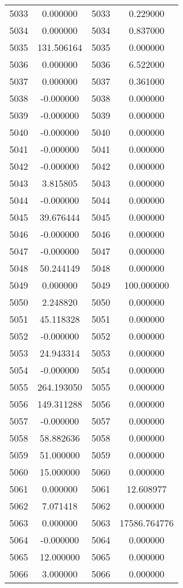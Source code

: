 \documentclass[12pt]{article}
\begin{document}
\begin{longtable}{@{}cccc@{}}
5033 & 0.000000 & 5033 & 0.229000 \\
5034 & 0.000000 & 5034 & 0.837000 \\
5035 & 131.506164 & 5035 & 0.000000 \\
5036 & 0.000000 & 5036 & 6.522000 \\
5037 & 0.000000 & 5037 & 0.361000 \\
5038 & -0.000000 & 5038 & 0.000000 \\
5039 & -0.000000 & 5039 & 0.000000 \\
5040 & -0.000000 & 5040 & 0.000000 \\
5041 & -0.000000 & 5041 & 0.000000 \\
5042 & -0.000000 & 5042 & 0.000000 \\
5043 & 3.815805 & 5043 & 0.000000 \\
5044 & -0.000000 & 5044 & 0.000000 \\
5045 & 39.676444 & 5045 & 0.000000 \\
5046 & -0.000000 & 5046 & 0.000000 \\
5047 & -0.000000 & 5047 & 0.000000 \\
5048 & 50.244149 & 5048 & 0.000000 \\
5049 & 0.000000 & 5049 & 100.000000 \\
5050 & 2.248820 & 5050 & 0.000000 \\
5051 & 45.118328 & 5051 & 0.000000 \\
5052 & -0.000000 & 5052 & 0.000000 \\
5053 & 24.943314 & 5053 & 0.000000 \\
5054 & -0.000000 & 5054 & 0.000000 \\
5055 & 264.193050 & 5055 & 0.000000 \\
5056 & 149.311288 & 5056 & 0.000000 \\
5057 & -0.000000 & 5057 & 0.000000 \\
5058 & 58.882636 & 5058 & 0.000000 \\
5059 & 51.000000 & 5059 & 0.000000 \\
5060 & 15.000000 & 5060 & 0.000000 \\
5061 & 0.000000 & 5061 & 12.608977 \\
5062 & 7.071418 & 5062 & 0.000000 \\
5063 & 0.000000 & 5063 & 17586.764776 \\
5064 & -0.000000 & 5064 & 0.000000 \\
5065 & 12.000000 & 5065 & 0.000000 \\
5066 & 3.000000 & 5066 & 0.000000 \\

\end{longtable}
\end{document}

